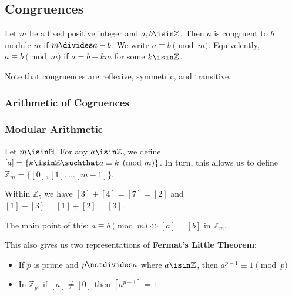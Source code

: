 \documentclass[12pt]{article}
\begin{document}


\subsection*{Congruences}
 Let $m$ be a fixed positive integer and $a,b \isin \mathbb{Z}$. Then $a$ is congruent to $b$ module $m$ if $m \divides a - b$. We write $a \equiv b \pmod m$. Equivelently, $a \equiv b \pmod m$ if $a = b + km$ for some $k \isin \mathbb{Z}$.

Note that congruences are reflexive, symmetric, and transitive.

\subsubsection*{Arithmetic of Cogruences}

\subsubsection*{Modular Arithmetic}
 Let $m \isin \mathbb{N}$. For any $a \isin \mathbb{Z}$, we define $[a] = \{ k \isin \mathbb{Z} \suchthat a \equiv k \pmod m \}$. In turn, this allows us to define $\mathbb{Z}_m = \{ [0], [1], ... [m-1] \}$.

Within $\mathbb{Z}_5$ we have $[3] + [4] = [7] = [2]$ and $[1] - [3] = [1] + [2] = [3]$.

The main point of this: $a \equiv b \pmod m \iff [a] = [b]$ in $\mathbb{Z}_m$.

This also gives us two representations of {\bf Fermat's Little Theorem}:
\begin{itemize}
\item If $p$ is prime and $p \notdivides a$ where $a \isin \mathbb{Z}$, then $a^{p-1} \equiv 1 \pmod p$
\item In $\mathbb{Z}_p$, if $[a] \neq [0]$ then $[a^{p-1}] = 1$
\end{itemize}
\end{document}
